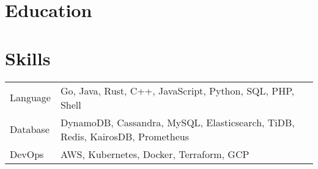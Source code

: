 \documentclass[11pt, letterpaper]{simple-cv}
\begin{document}




\section{Education}
{}

\section{Skills}
\begin{flushleft}
	\begin{tabular}{@{}ll@{}}
		Language  & Go, Java, Rust, C++, JavaScript, Python, SQL, PHP, Shell                                                  \\
		Database  & DynamoDB, Cassandra, MySQL, Elasticsearch, TiDB, Redis, KairosDB, Prometheus \\
		DevOps    & AWS, Kubernetes, Docker, Terraform, GCP                                                         \\
	\end{tabular}
\end{flushleft}
\end{document}
